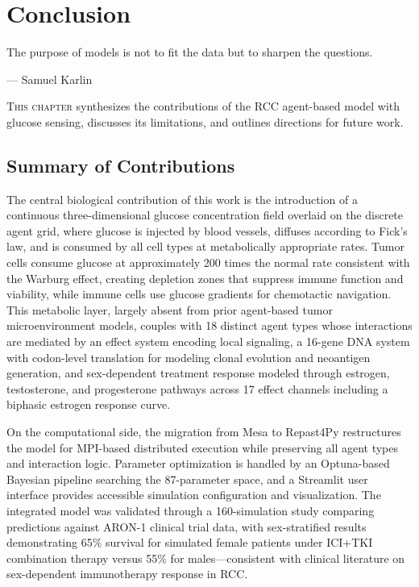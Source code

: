 \chapter{Conclusion}
\label{ch:conclusion}

\epigraph{The purpose of models is not to fit the data but to sharpen the questions.}{--- Samuel Karlin}

\lettrine[lines=2]{T}{his chapter} synthesizes the contributions of the RCC agent-based model with glucose sensing, discusses its limitations, and outlines directions for future work.

\section{Summary of Contributions}
\label{sec:contributions}

The central biological contribution of this work is the introduction of a continuous three-dimensional glucose concentration field overlaid on the discrete agent grid, where glucose is injected by blood vessels, diffuses according to Fick's law, and is consumed by all cell types at metabolically appropriate rates. Tumor cells consume glucose at approximately 200 times the normal rate consistent with the Warburg effect, creating depletion zones that suppress immune function and viability, while immune cells use glucose gradients for chemotactic navigation. This metabolic layer, largely absent from prior agent-based tumor microenvironment models, couples with 18 distinct agent types whose interactions are mediated by an effect system encoding local signaling, a 16-gene DNA system with codon-level translation for modeling clonal evolution and neoantigen generation, and sex-dependent treatment response modeled through estrogen, testosterone, and progesterone pathways across 17 effect channels including a biphasic estrogen response curve.

On the computational side, the migration from Mesa to Repast4Py restructures the model for MPI-based distributed execution while preserving all agent types and interaction logic. Parameter optimization is handled by an Optuna-based Bayesian pipeline searching the 87-parameter space, and a Streamlit user interface provides accessible simulation configuration and visualization. The integrated model was validated through a 160-simulation study comparing predictions against ARON-1 clinical trial data, with sex-stratified results demonstrating 65\% survival for simulated female patients under ICI+TKI combination therapy versus 55\% for males---consistent with clinical literature on sex-dependent immunotherapy response in RCC.

